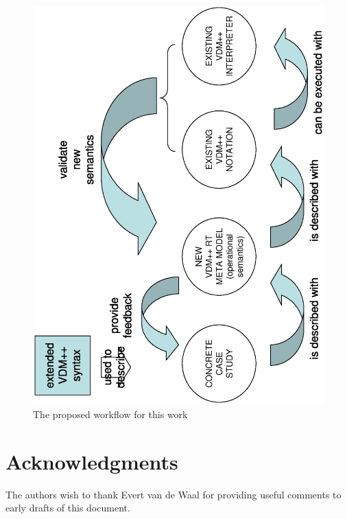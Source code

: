 \documentclass{llncs}
\begin{document}
\begin{figure}[htb]
\begin{center}
\includegraphics[width=0.6\columnwidth,angle=-90]{workflow.eps}
\caption{The proposed workflow for this work} \label{fig:workflow}
\end{center}
\end{figure}


\nocite{*}




\section*{Acknowledgments}

The authors wish to thank Evert van de Waal for providing useful
comments to early drafts of this document.




\end{document}
